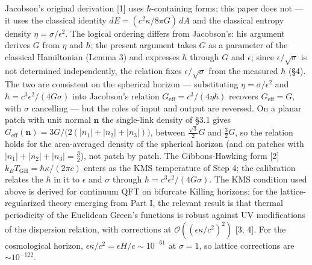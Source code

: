 \documentclass[
]{article}
\begin{document}
Jacobson's original derivation {[}1{]} uses \(\hbar\)-containing forms;
this paper does not --- it uses the classical identity
\(dE = (c^2 \kappa / 8\pi G)\,dA\) and the classical entropy density
\(\eta = \sigma/\epsilon^2\). The logical ordering differs from
Jacobson's: his argument derives \(G\) from \(\eta\) and \(\hbar\); the
present argument takes \(G\) as a parameter of the classical Hamiltonian
(Lemma 3) and expresses \(\hbar\) through \(G\) and \(\epsilon\); since
\(\epsilon/\sqrt{\sigma}\) is not determined independently, the relation
fixes \(\epsilon/\sqrt{\sigma}\) from the measured \(\hbar\) (§4). The
two are consistent on the spherical horizon --- substituting
\(\eta = \sigma/\epsilon^2\) and \(\hbar = c^3\epsilon^2/(4G\sigma)\)
into Jacobson's relation \(G_{\text{eff}} = c^3/(4\eta\hbar)\) recovers
\(G_{\text{eff}} = G\), with \(\sigma\) cancelling --- but the roles of
input and output are reversed. On a planar patch with unit normal
\(\mathbf n\) the single-link density of §3.1 gives
\(G_{\text{eff}}(\mathbf n) = 3G/\big(2(\lvert n_1\rvert+\lvert n_2\rvert+\lvert n_3\rvert)\big)\),
between \(\tfrac{\sqrt3}{2}G\) and \(\tfrac32G\), so the relation holds
for the area-averaged density of the spherical horizon (and on patches
with \(\lvert n_1\rvert+\lvert n_2\rvert+\lvert n_3\rvert = \tfrac32\)),
not patch by patch. The Gibbons-Hawking form {[}2{]}
\(k_B T_{\text{GH}} = \hbar \kappa / (2\pi c)\) enters as the KMS
temperature of Step 4; the calibration relates the \(\hbar\) in it to
\(\epsilon\) and \(\sigma\) through
\(\hbar = c^3\epsilon^2/(4G\sigma)\). The KMS condition used above is
derived for continuum QFT on bifurcate Killing horizons; for the
lattice-regularized theory emerging from Part I, the relevant result is
that thermal periodicity of the Euclidean Green's functions is robust
against UV modifications of the dispersion relation, with corrections at
\(\mathcal{O}((\epsilon\kappa/c^2)^2)\) {[}3, 4{]}. For the cosmological
horizon, \(\epsilon\kappa/c^2 = \epsilon H / c \sim 10^{-61}\) at
\(\sigma = 1\), so lattice corrections are \(\sim 10^{-122}\).
\end{document}
